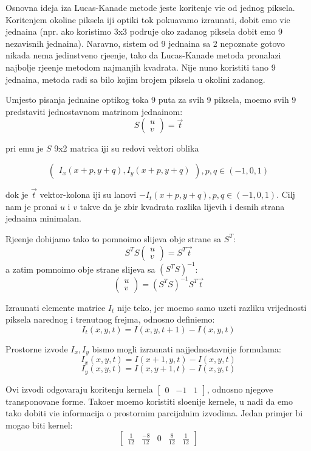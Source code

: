 Osnovna ideja iza Lucas-Kanade metode jeste kori\sh tenje vi\sh e od jednog piksela. Kori\sh tenjem okoline piksela \ch iji opti\ch ki tok poku\sh avamo izra\ch unati, dobit \cj emo vi\sh e jedna\ch ina
(npr. ako koristimo 3x3 podru\ch je oko zadanog piksela dobit \cj emo 9 nezavisnih jedna\ch ina). Naravno, sistem od 9 jedna\ch ina sa 2 nepoznate gotovo nikada nema jedinstveno rje\sh enje,
tako da Lucas-Kanade metoda pronalazi najbolje rje\sh enje metodom najmanjih kvadrata. Nije nu\zh no koristiti ta\ch no 9 jedna\ch ina, metoda radi sa bilo kojim brojem piksela u okolini zadanog.

Umjesto pisanja jedna\ch ine opti\ch kog toka 9 puta za svih 9 piksela, mo\zh emo svih 9 predstaviti jednostavnom matri\ch nom jedna\ch inom:
\[
S
\begin{pmatrix}
u \\
v
\end{pmatrix}
=\vec{t}
\]

pri \ch emu je $S$ 9x2 matrica \ch iji su redovi vektori oblika 

\[
\begin{pmatrix}I_x(x+p,y+q),I_y(x+p,y+q)\end{pmatrix},p,q\in (-1,0,1)
\] 

dok je $\vec{t}$ vektor-kolona \ch iji su \ch lanovi
$-I_t(x+p,y+q),p,q\in (-1,0,1)$. Cilj nam je prona\cj i $u$ i $v$ takve da je zbir kvadrata razlika lijevih i desnih strana jedna\ch ina minimalan.

Rje\sh enje dobijamo tako \sh to pomno\zh imo slijeva obje strane sa $S^T$:
\[
S^TS\begin{pmatrix}u \\ v\end{pmatrix}=S^T\vec{t}
\]
a zatim pomno\zh imo obje strane slijeva sa $(S^TS)^{-1}$:
\[
\begin{pmatrix}u \\ v\end{pmatrix}=(S^TS)^{-1}S^T\vec{t}
\]

Izra\ch unati elemente matrice $I_t$ nije te\sh ko, jer mo\zh emo samo uzeti razliku vrijednosti piksela narednog i trenutnog frejma, odnosno defini\sh emo:
\[
I_t(x,y,t)=I(x,y,t+1)-I(x,y,t)
\]

Prostorne izvode $I_x,I_y$ bismo mogli izra\ch unati najjednostavnije formulama:
\[
I_x(x,y,t)=I(x+1,y,t)-I(x,y,t)
\]
\[
I_y(x,y,t)=I(x,y+1,t)-I(x,y,t)
\]

Ovi izvodi odgovaraju kori\sh tenju kernela $\begin{bmatrix}0 & -1 & 1\end{bmatrix}$, odnosno njegove transponovane forme. Tako\dj er mo\zh emo koristiti
slo\zh enije kernele, u nadi da \cj emo tako dobiti vi\sh e informacija o prostornim parcijalnim izvodima. Jedan primjer bi mogao biti kernel:
\[
\begin{bmatrix}
\frac{1}{12} & \frac{-8}{12} & 0 & \frac{8}{12} & \frac{1}{12}
\end{bmatrix}
\]

